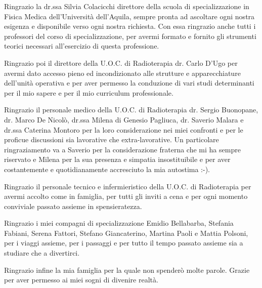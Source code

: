 Ringrazio la dr.ssa Silvia Colacicchi direttore della scuola di specializzazione in Fisica Medica dell'Università dell'Aquila, sempre pronta ad ascoltare ogni nostra esigenza e disponibile verso ogni nostra richiesta. Con essa ringrazio anche tutti i professori del corso di specializzazione, per avermi formato e fornito gli strumenti teorici necessari all'esercizio di questa professione.

\vspace*{2ex}

Ringrazio poi il direttore della U.O.C. di Radioterapia dr. Carlo D'Ugo per avermi dato accesso pieno ed incondizionato alle strutture e apparecchiature dell'unità operativa e per aver permesso la conduzione di vari studi determinanti per il mio sapere e per il mio curriculum professionale.

\vspace*{2ex}

Ringrazio il personale medico della U.O.C. di Radioterapia dr. Sergio Buonopane, dr. Marco De Nicolò, dr.ssa Milena di Genesio Pagliuca, dr. Saverio Malara e dr.ssa Caterina Montoro per la loro considerazione nei miei confronti e per le proficue discussioni sia lavorative che extra-lavorative. Un particolare ringraziamento va a Saverio per la considerazione fraterna che mi ha sempre riservato e Milena per la sua presenza e simpatia insostituibile e per aver costantemente e quotidianamente accresciuto la mia autostima :-).

\vspace*{2ex}

Ringrazio il personale tecnico e infermieristico della U.O.C. di Radioterapia per avermi accolto come in famiglia, per tutti gli inviti a cena e per ogni momento conviviale passato assieme in spensieratezza.

\vspace*{2ex}

Ringrazio i miei compagni di specializzazione Emidio Bellabarba, Stefania Fabiani, Serena Fattori, Stefano Giancaterino, Martina Paoli e Mattia Polsoni, per i viaggi assieme, per i passaggi e per tutto il tempo passato assieme sia a studiare che a divertirci.

\vspace*{2ex}

Ringrazio infine la mia famiglia per la quale non spenderò molte parole. Grazie per aver permesso ai miei sogni di divenire realtà.






 